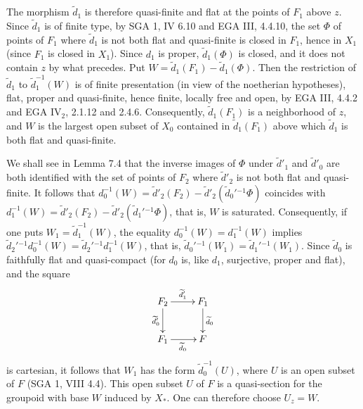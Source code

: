 The morphism $\widetilde d_1$ is therefore quasi-finite and flat at the points of $F_1$ above $z$. Since $\widetilde d_1$ is of finite type, by SGA 1, IV 6.10 and EGA III, 4.4.10, the set $\Phi$ of points of $F_1$ where $\widetilde d_1$ is not both flat and quasi-finite is closed in $F_1$, hence in $X_1$ (since $F_1$ is closed in $X_1$). Since $d_1$ is proper, $\widetilde d_1(\Phi)$ is closed, and it does not contain $z$ by what precedes. Put $W=\widetilde d_1(F_1)-\widetilde d_1(\Phi)$. Then the restriction of $\widetilde d_1$ to $\widetilde d_1^{-1}(W)$ is of finite presentation (in view of the noetherian hypotheses), flat, proper and quasi-finite, hence finite, locally free and open, by EGA III, 4.4.2 and EGA IV$_2$, 2.1.12 and 2.4.6. Consequently, $\widetilde d_1(F_1)$ is a neighborhood of $z$, and $W$ is the largest open subset of $X_0$ contained in $\widetilde d_1(F_1)$ above which $\widetilde d_1$ is both flat and quasi-finite.

We shall see in Lemma 7.4 that the inverse images of $\Phi$ under $\widetilde d'_1$ and $\widetilde d'_0$ are both identified with the set of points of $F_2$ where $\widetilde d'_2$ is not both flat and quasi-finite. It follows that $d_0^{-1}(W)=\widetilde d'_2(F_2)-\widetilde d'_2(\widetilde d_0'{}^{-1}\Phi)$ coincides with $d_1^{-1}(W)=\widetilde d'_2(F_2)-\widetilde d'_2(\widetilde d_1'{}^{-1}\Phi)$, that is, $W$ is saturated. Consequently, if one puts $W_1=\widetilde d_1^{-1}(W)$, the equality $d_0^{-1}(W)=d_1^{-1}(W)$ implies $\widetilde d_2'{}^{-1}d_0^{-1}(W)=\widetilde d_2'{}^{-1}d_1^{-1}(W)$, that is, $\widetilde d_0'{}^{-1}(W_1)=\widetilde d_1'{}^{-1}(W_1)$. Since $\widetilde d_0$ is faithfully flat and quasi-compact (for $d_0$ is, like $d_1$, surjective, proper and flat), and the square
\[
\xymatrix{F_2\ar[r]^{\widetilde d'_1}\ar[d]_{\widetilde d'_0}&F_1\ar[d]^{\widetilde d_0}\\F_1\ar[r]_{\widetilde d_0}&F}
\]
is cartesian, it follows that $W_1$ has the form $\widetilde d_0^{-1}(U)$, where $U$ is an open subset of $F$ (SGA 1, VIII 4.4). This open subset $U$ of $F$ is a quasi-section for the groupoid with base $W$ induced by $X_*$. One can therefore choose $U_z=W$.


